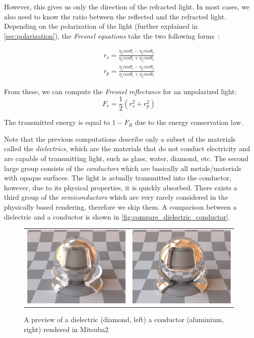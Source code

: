 However, this gives us only the direction of the refracted light. In most cases, we also need to know the ratio between the reflected and the refracted light. Depending on the polarization of the light (further explained in \autoref{sec:polarization}), the \emph{Fresnel equations} take the two following forms~\cite{pharr2016physically}:

\begin{align*}
r_s = \frac{\eta_t cos\theta_i - \eta_i cos\theta_t}{\eta_t cos\theta_i + \eta_i cos\theta_t}\\
r_p = \frac{\eta_i cos\theta_i - \eta_t cos\theta_t}{\eta_i cos\theta_i + \eta_t cos\theta_t} 
\end{align*}

From these, we can compute the \emph{Fresnel reflectance} for an unpolarized light:
\begin{equation}
F_r=\frac{1}{2}(r_s^2 + r_p^2)
\end{equation}

The transmitted energy is equal to $1-F_R$ due to the energy conservation law.

Note that the previous computations describe only a subset of the materials called the \emph{dielectrics}, which are the materials that do not conduct electricity and are capable of transmitting light, such as glass, water, diamond, etc. The second large group consists of the \emph{conductors} which are basically all metals/materials with opaque surfaces. The light is actually transmitted into the conductor, however, due to its physical properties, it is quickly absorbed. There exists a third group of the \emph{semiconductors} which are very rarely considered in the physically based rendering, therefore we skip them. A comparison between a dielectric and a conductor is shown in \autoref{fig:compare_dielectric_conductor}.

\begin{figure}[h]
	\centering
	\begin{tabular}{cc}
		\includegraphics[width=.4\linewidth]{img/dielectric_diamond.jpg}
		&
		\includegraphics[width=.4\linewidth]{img/conductor_aluminium.jpg}
	\end{tabular}
	\caption{A preview of a dielectric (diamond, left) a  conductor (aluminium, right) rendered in Mitsuba2~\cite{mitsubaWeb}}
	\label{fig:compare_dielectric_conductor}
\end{figure}

